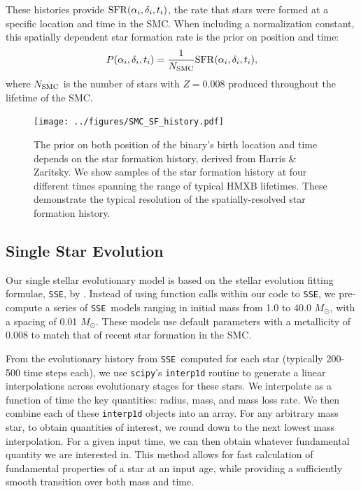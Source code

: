 \documentclass[12pt, preprint]{aastex}
\newcommand{\Msun}{\ifmmode {M_{\odot}}\else${M_{\odot}}$\fi}
\newcommand{\sse}{{\tt SSE}}
\begin{document}
These histories provide ${\rm SFR}(\alpha_i, \delta_i, t_i)$, the rate that stars were formed at a specific location and time in the SMC. When including a normalization constant, this spatially dependent star formation rate is the prior on position and time:
\begin{equation}
P(\alpha_i, \delta_i, t_i) = \frac{1}{N_{\rm SMC}} {\rm SFR}(\alpha_i, \delta_i, t_i),
\end{equation}
where $N_{\rm SMC}$ is the number of stars with $Z=0.008$ produced throughout the lifetime of the SMC.



\begin{figure}[h!]
\begin{center}
\texttt{[image: ../figures/SMC\_SF\_history.pdf]}
\caption{The prior on both position of the binary's birth location and time depends on the star formation history, derived from Harris \& Zaritsky. We show samples of the star formation history at four different times spanning the range of typical HMXB lifetimes. These demonstrate the typical resolution of the spatially-resolved star formation history.}
\label{fig:prior_SFH}
\end{center}
\end{figure}




\subsection{Single Star Evolution} \label{sec:single_star}

Our single stellar evolutionary model is based on the stellar evolution fitting formulae, \sse, by \citet{hurley00}. Instead of using function calls within our code to \sse, we pre-compute a series of \sse\ models ranging in initial mass from 1.0 to 40.0 \Msun, with a spacing of 0.01 \Msun. These models use default parameters with a metallicity of 0.008 to match that of recent star formation in the SMC.

From the evolutionary history from \sse\ computed for each star (typically 200-500 time steps each), we use {\tt scipy}'s {\tt interp1d} routine to generate a linear interpolations across evolutionary stages for these stars. We interpolate as a function of time the key quantities: radius, mass, and mass loss rate. We then combine each of these {\tt interp1d} objects into an array. For any arbitrary mass star, to obtain quantities of interest, we round down to the next lowest mass interpolation. For a given input time, we can then obtain whatever fundamental quantity we are interested in. This method allows for fast calculation of fundamental properties of a star at an input age, while providing a sufficiently smooth transition over both mass and time.
\end{document}
